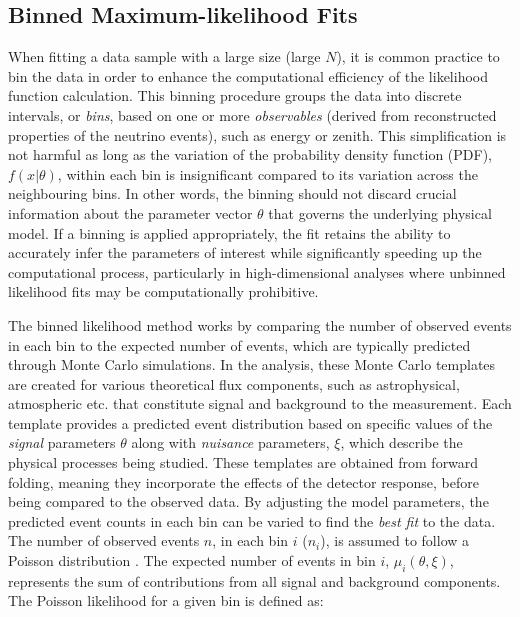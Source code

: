 \subsection{Binned Maximum-likelihood Fits}
\label{sec:MLE}
When fitting a data sample with a large size (large $N$), it is common practice to bin the data in order to enhance the computational efficiency of the likelihood function calculation. This binning procedure groups the data into discrete intervals, or \emph{bins}, based on one or more \emph{observables} (derived from reconstructed properties of the neutrino events), such as energy or zenith. This simplification is not harmful as long as the variation of the probability density function (PDF), $f(x|\theta)$, within each bin is insignificant compared to its variation across the neighbouring bins. In other words, the binning should not discard crucial information about the parameter vector $\theta$ that governs the underlying physical model. If a binning is applied appropriately, the fit retains the ability to accurately infer the parameters of interest while significantly speeding up the computational process, particularly in high-dimensional analyses where unbinned likelihood fits may be computationally prohibitive.

The binned likelihood method works by comparing the number of observed events in each bin to the expected number of events, which are typically predicted through Monte Carlo simulations. In the analysis, these Monte Carlo templates are created for various theoretical flux components, such as astrophysical, atmospheric etc. that constitute signal and background to the measurement. Each template provides a predicted event distribution based on specific values of the \emph{signal} parameters $\theta$ along with \emph{nuisance} parameters, $\xi$, which describe the physical processes being studied. These templates are obtained from forward folding, meaning they incorporate the effects of the detector response, before being compared to the observed data. By adjusting the model parameters, the predicted event counts in each bin can be varied to find the \emph{best fit} to the data. The number of observed events $n$, in each bin $i$ ($n_i$), is assumed to follow a Poisson distribution . The expected number of events in bin $i$, $\mu_i(\theta,\xi)$, represents the sum of contributions from all signal and background components. The Poisson likelihood for a given bin is defined as:

